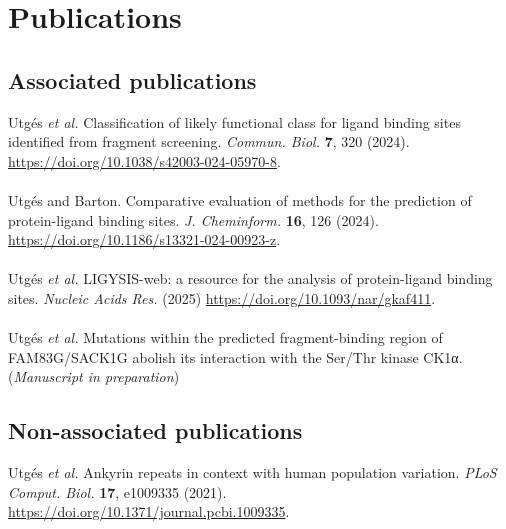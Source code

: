 \chapter*{Publications}

\section*{Associated publications}

Utgés \textit{et al.} Classification of likely functional class for ligand binding sites identified from fragment screening. \textit{Commun. Biol.} \textbf{7}, 320 (2024). \url{https://doi.org/10.1038/s42003-024-05970-8}.
\\\\ 
\noindent
Utgés and Barton. Comparative evaluation of methods for the prediction of protein-ligand binding sites. \textit{J. Cheminform.} \textbf{16}, 126 (2024). \url{https://doi.org/10.1186/s13321-024-00923-z}.
\\\\ 
\noindent
Utgés \textit{et al.} LIGYSIS-web: a resource for the analysis of protein-ligand binding sites. \textit{Nucleic Acids Res.} (2025) \url{https://doi.org/10.1093/nar/gkaf411}.
\\\\ 
\noindent
Utgés \textit{et al.} Mutations within the predicted fragment-binding region of FAM83G/SACK1G abolish its interaction with the Ser/Thr kinase CK1α. (\textit{Manuscript in preparation})

\section*{Non-associated publications}

Utgés \textit{et al.} Ankyrin repeats in context with human population variation. \textit{PLoS Comput. Biol.} \textbf{17}, e1009335 (2021). \url{https://doi.org/10.1371/journal.pcbi.1009335}.
